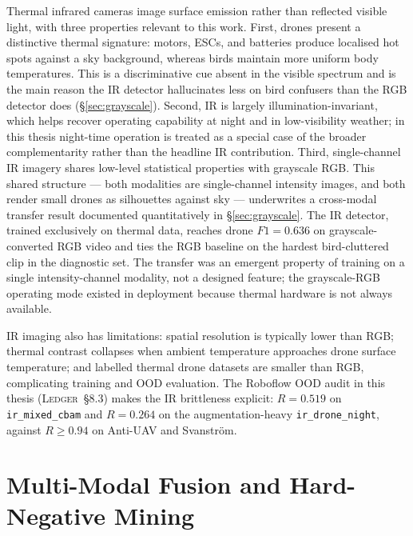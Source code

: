 \documentclass[12pt,a4paper,oneside,openright]{book}
\begin{document}
Thermal infrared cameras image surface emission rather than reflected visible light, with three properties relevant to this work. First, drones present a distinctive thermal signature: motors, ESCs, and batteries produce localised hot spots against a sky background, whereas birds maintain more uniform body temperatures. This is a discriminative cue absent in the visible spectrum and is the main reason the IR detector hallucinates less on bird confusers than the RGB detector does (\S\ref{sec:grayscale}). Second, IR is largely illumination-invariant, which helps recover operating capability at night and in low-visibility weather; in this thesis night-time operation is treated as a special case of the broader complementarity rather than the headline IR contribution. Third, single-channel IR imagery shares low-level statistical properties with grayscale RGB. This shared structure --- both modalities are single-channel intensity images, and both render small drones as silhouettes against sky --- underwrites a cross-modal transfer result documented quantitatively in \S\ref{sec:grayscale}. The IR detector, trained exclusively on thermal data, reaches drone $F1=0.636$ on grayscale-converted RGB video and ties the RGB baseline on the hardest bird-cluttered clip in the diagnostic set. The transfer was an emergent property of training on a single intensity-channel modality, not a designed feature; the grayscale-RGB operating mode existed in deployment because thermal hardware is not always available.

IR imaging also has limitations: spatial resolution is typically lower than RGB; thermal contrast collapses when ambient temperature approaches drone surface temperature; and labelled thermal drone datasets are smaller than RGB, complicating training and OOD evaluation. The Roboflow OOD audit in this thesis (\textsc{Ledger}~\S8.3) makes the IR brittleness explicit: $R=0.519$ on \texttt{ir\_mixed\_cbam} and $R=0.264$ on the augmentation-heavy \texttt{ir\_drone\_night}, against $R\geq 0.94$ on Anti-UAV and Svanstr\"om.

\section{Multi-Modal Fusion and Hard-Negative Mining}
\label{sec:lit_fusion}
\end{document}
